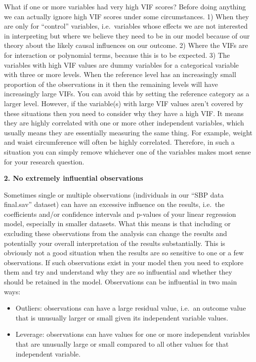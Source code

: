 \documentclass[
]{book}
\begin{document}
What if one or more variables had very high VIF scores? Before doing anything we can actually ignore high VIF scores under some circumstances. 1) When they are only for ``control'' variables, i.e.~variables whose effects we are not interested in interpreting but where we believe they need to be in our model because of our theory about the likely causal influences on our outcome. 2) Where the VIFs are for interaction or polynomial terms, because this is to be expected. 3) The variables with high VIF values are dummy variables for a categorical variable with three or more levels. When the reference level has an increasingly small proportion of the observations in it then the remaining levels will have increasingly large VIFs. You can avoid this by setting the reference category as a larger level. However, if the variable(s) with large VIF values aren't covered by these situations then you need to consider why they have a high VIF. It means they are highly correlated with one or more other independent variables, which usually means they are essentially measuring the same thing. For example, weight and waist circumference will often be highly correlated. Therefore, in such a situation you can simply remove whichever one of the variables makes most sense for your research question.

\textbf{2. No extremely influential observations}

Sometimes single or multiple observations (individuals in our ``SBP data final.sav'' dataset) can have an excessive influence on the results, i.e.~the coefficients and/or confidence intervals and p-values of your linear regression model, especially in smaller datasets. What this means is that including or excluding these observations from the analysis can change the results and potentially your overall interpretation of the results substantially. This is obviously not a good situation when the results are so sensitive to one or a few observations. If such observations exist in your model then you need to explore them and try and understand why they are so influential and whether they should be retained in the model. Observations can be influential in two main ways:

\begin{itemize}
\item
  Outliers: observations can have a large residual value, i.e.~an outcome value that is unusually larger or small given its independent variable values.
\item
  Leverage: observations can have values for one or more independent variables that are unusually large or small compared to all other values for that independent variable.
\end{itemize}
\end{document}
